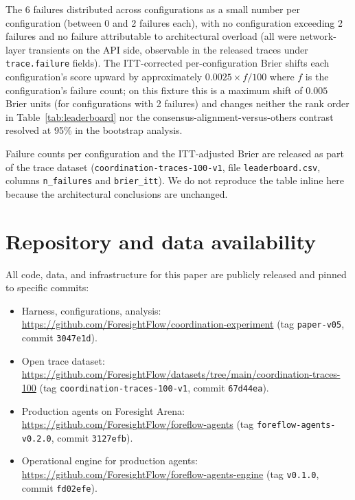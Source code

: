 \documentclass[11pt]{article}
\begin{document}
The 6 failures distributed across configurations as a small number per configuration (between 0 and 2 failures each), with no configuration exceeding 2 failures and no failure attributable to architectural overload (all were network-layer transients on the API side, observable in the released traces under \texttt{trace.failure} fields). The ITT-corrected per-configuration Brier shifts each configuration's score upward by approximately $0.0025 \times f / 100$ where $f$ is the configuration's failure count; on this fixture this is a maximum shift of $0.005$ Brier units (for configurations with 2 failures) and changes neither the rank order in Table~\ref{tab:leaderboard} nor the consensus-alignment-versus-others contrast resolved at 95\% in the bootstrap analysis.

Failure counts per configuration and the ITT-adjusted Brier are released as part of the trace dataset (\texttt{coordination-traces-100-v1}, file \texttt{leaderboard.csv}, columns \texttt{n\_failures} and \texttt{brier\_itt}). We do not reproduce the table inline here because the architectural conclusions are unchanged.

\section{Repository and data availability}
\label{app:availability}

All code, data, and infrastructure for this paper are publicly released and pinned to specific commits:

\begin{itemize}
\item Harness, configurations, analysis: \url{https://github.com/ForesightFlow/coordination-experiment} (tag \texttt{paper-v05}, commit \texttt{3047e1d}).
\item Open trace dataset: \url{https://github.com/ForesightFlow/datasets/tree/main/coordination-traces-100} (tag \texttt{coordination-traces-100-v1}, commit \texttt{67d44ea}).
\item Production agents on Foresight Arena: \url{https://github.com/ForesightFlow/foreflow-agents} (tag \texttt{foreflow-agents-v0.2.0}, commit \texttt{3127efb}).
\item Operational engine for production agents: \url{https://github.com/ForesightFlow/foreflow-agents-engine} (tag \texttt{v0.1.0}, commit \texttt{fd02efe}).
\end{itemize}
\end{document}
